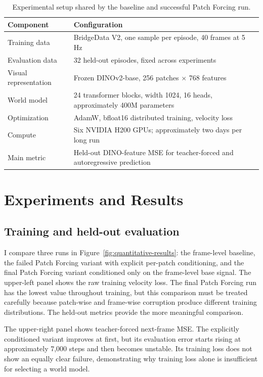 \documentclass[10pt,a4paper]{article}
\begin{document}
\begin{table}[H]
\centering
\small
\begin{tabular}{L{4.0cm}L{9.5cm}}
\toprule
\textbf{Component} & \textbf{Configuration} \\
\midrule
Training data & BridgeData V2, one sample per episode, 40 frames at 5 Hz \\
Evaluation data & 32 held-out episodes, fixed across experiments \\
Visual representation & Frozen DINOv2-base, 256 patches $\times$ 768 features \\
World model & 24 transformer blocks, width 1024, 16 heads, approximately 400M parameters \\
Optimization & AdamW, bfloat16 distributed training, velocity loss \\
Compute & Six NVIDIA H200 GPUs; approximately two days per long run \\
Main metric & Held-out DINO-feature MSE for teacher-forced and autoregressive prediction \\
\bottomrule
\end{tabular}
\caption{Experimental setup shared by the baseline and successful Patch Forcing run.}
\label{tab:setup}
\end{table}

\section{Experiments and Results}

\subsection{Training and held-out evaluation}

I compare three runs in Figure~\ref{fig:quantitative-results}: the frame-level baseline, the failed Patch Forcing variant with explicit per-patch conditioning, and the final Patch Forcing variant conditioned only on the frame-level base signal. The upper-left panel shows the raw training velocity loss. The final Patch Forcing run has the lowest value throughout training, but this comparison must be treated carefully because patch-wise and frame-wise corruption produce different training distributions. The held-out metrics provide the more meaningful comparison.

The upper-right panel shows teacher-forced next-frame MSE. The explicitly conditioned variant improves at first, but its evaluation error starts rising at approximately 7,000 steps and then becomes unstable. Its training loss does not show an equally clear failure, demonstrating why training loss alone is insufficient for selecting a world model.
\end{document}
